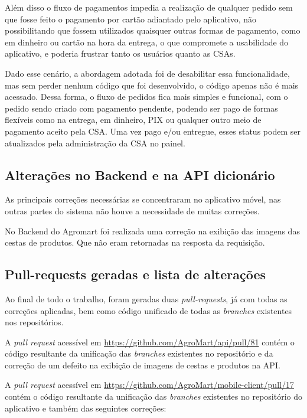Além disso o fluxo de pagamentos impedia a realização de qualquer pedido sem que fosse feito o pagamento por cartão adiantado pelo aplicativo, não possibilitando que fossem utilizados quaisquer outras formas de pagamento, como em dinheiro ou cartão na hora da entrega, o que compromete a usabilidade do aplicativo, e poderia frustrar tanto os usuários quanto as CSAs.

Dado esse cenário, a abordagem adotada foi de desabilitar essa funcionalidade, mas sem perder nenhum código que foi desenvolvido, o código apenas não é mais acessado. Dessa forma, o fluxo de pedidos fica mais simples e funcional, com o pedido sendo criado com pagamento pendente, podendo ser pago de formas flexíveis como na entrega, em dinheiro, PIX ou qualquer outro meio de pagamento aceito pela CSA. Uma vez pago e/ou entregue, esses status podem ser atualizados pela administração da CSA no painel.

\subsection{Alterações no Backend e na API dicionário}
As principais correções necessárias se concentraram no aplicativo móvel, nas outras partes do sistema não houve a necessidade de muitas correções.

No Backend do Agromart foi realizada uma correção na exibição das imagens das cestas de produtos. Que não eram retornadas na resposta da requisição.

\subsection{Pull-requests geradas e lista de alterações}

Ao final de todo o trabalho, foram geradas duas \textit{pull-requests}, já com todas as correções aplicadas, bem como código unificado de todas as \textit{branches} existentes nos repositórios.

A \textit{pull request} acessível em \url{https://github.com/AgroMart/api/pull/81} contém o código resultante da unificação das \textit{branches} existentes no repositório e da correção de um defeito na exibição de imagens de cestas e produtos na API.

A \textit{pull request} acessível em \url{https://github.com/AgroMart/mobile-client/pull/17} contém o código resultante da unificação das \textit{branches} existentes no repositório do aplicativo e também das seguintes correções: 

